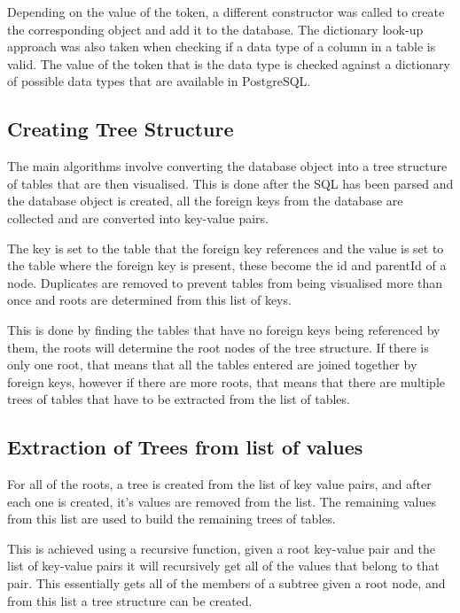 Depending on the value of the token, a different constructor was called to create the corresponding object and add it to the database. The dictionary look-up approach was also taken when checking if a data type of a column in a table is valid. The value of the token that is the data type is checked against a dictionary of possible data types that are available in PostgreSQL.

\subsection{Creating Tree Structure}

The main algorithms involve converting the database object into a tree structure of tables that are then visualised. This is done after the SQL has been parsed and the database object is created, all the foreign keys from the database are collected and are converted into key-value pairs. 

The key is set to the table that the foreign key references and the value is set to the table where the foreign key is present, these become the id and parentId of a node. Duplicates are removed to prevent tables from being visualised more than once and roots are determined from this list of keys. 

This is done by finding the tables that have no foreign keys being referenced by them, the roots will determine the root nodes of the tree structure. If there is only one root, that means that all the tables entered are joined together by foreign keys, however if there are more roots, that means that there are multiple trees of tables that have to be extracted from the list of tables. 

\subsection{Extraction of Trees from list of values}

For all of the roots, a tree is created from the list of key value pairs, and after each one is created, it's values are removed from the list. The remaining values from this list are used to build the remaining trees of tables. 

This is achieved using a recursive function, given a root key-value pair and the list of key-value pairs it will recursively get all of the values that belong to that pair. This essentially gets all of the members of a subtree given a root node, and from this list a tree structure can be created. 

